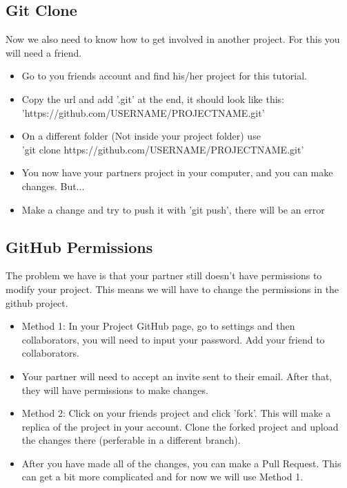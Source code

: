 \documentclass{beamer}
\begin{document}
\subsection{Git Clone}
\begin{frame}
Now we also need to know how to get involved in another project. For this you will need a friend.\\
 \begin{itemize}
  \item Go to you friends account and find his/her project for this tutorial.
  \item Copy the url and add '.git' at the end, it should look like this:\\ 'https://github.com/USERNAME/PROJECTNAME.git'
  \item On a different folder (Not inside your project folder) use \\'git clone https://github.com/USERNAME/PROJECTNAME.git' 
  \item You now have your partners project in your computer, and you can make changes. But...
  \item  Make a change and try to push it with 'git push', there will be an error
 \end{itemize}
\end{frame}

\subsection{GitHub Permissions}
\begin{frame}
The problem we have is that your partner still doesn't have permissions to modify your project. This means we will have to change the permissions in the github project.\\
 \begin{itemize}
 \item Method 1: In your Project GitHub page, go to settings and then collaborators, you will need to input your password. Add your friend to collaborators.
 \item Your partner will need to accept an invite sent to their email. After that, they will have permissions to make changes.
 \item Method 2: Click on your friends project and click 'fork'. This will make a replica of the project in your account. Clone the forked project and upload the changes there (perferable in a different branch).
 \item After you have made all of the changes, you can make a Pull Request. This can get a bit more complicated and for now we will use Method 1. 
 \end{itemize}
\end{frame}
\end{document}
